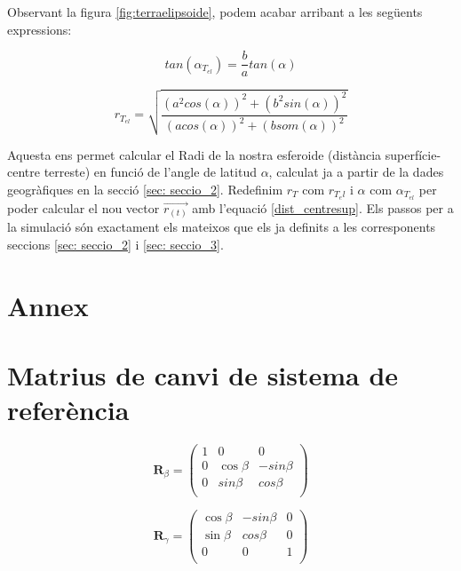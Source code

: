 \documentclass[11pt]{article}
\begin{document}
Observant la figura \ref{fig:terraelipsoide}, podem acabar arribant a les següents expressions:

\begin{equation}
    tan(\alpha_{T_{el}}) = \frac{b}{a}tan(\alpha) 
\end{equation}

\begin{equation}
    r_{T_{el}} = \sqrt{\frac{(a^2cos(\alpha))^2+(b^2sin(\alpha))^2}{(acos(\alpha))^2+(bsom(\alpha))^2}}
\end{equation}

Aquesta ens permet calcular el Radi de la nostra esferoide (distància superfície-centre terreste) en funció de l'angle de latitud $\alpha$, calculat ja a partir de la dades geogràfiques en la secció \ref{sec: seccio_2}. Redefinim $r_T$ com $r_{T_el}$ i $\alpha$ com $\alpha_{T_{el}}$ per poder calcular el nou vector $\vec{r_{(t)}}$ amb l'equació \eqref{dist_centresup}. Els passos per a la simulació són exactament els mateixos que els ja definits a les corresponents seccions \ref{sec: seccio_2} i \ref{sec: seccio_3}.

\section*{Annex}
\appendix

\section{Matrius de canvi de sistema de referència}\label{annex: matr_rot}
\begin{equation}
    \mathbf{R}_{\beta}=
    \begin{pmatrix}
      1 & 0 & 0   \\
      0 & \cos\beta& -sin\beta \\
      0 & sin\beta & cos\beta \\
    \end{pmatrix}
\end{equation}  

\begin{equation}
    \mathbf{R}_{\gamma}=
    \begin{pmatrix}
       \cos\beta& -sin\beta& 0 \\
       \sin\beta & cos\beta &0\\
      0 & 0 & 1  \\
    \end{pmatrix}
\end{equation}  
\end{document}

